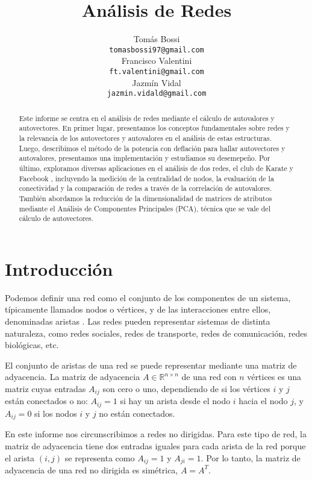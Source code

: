 \documentclass{article}
\title{Análisis de Redes}
\author{%
  Tomás Bossi\\
  \texttt{tomasbossi97@gmail.com} \\
  \And
  Francisco Valentini \\
  \texttt{ft.valentini@gmail.com} \\
  \And
  Jazmín Vidal \\
  \texttt{jazmin.vidald@gmail.com} \\
}
\begin{document}
\maketitle

\begin{abstract}
Este informe se centra en el análisis de redes mediante el cálculo de autovalores y autovectores. En primer lugar, presentamos los conceptos fundamentales sobre redes y la relevancia de los autovectores y autovalores en el análisis de estas estructuras. Luego, describimos el método de la potencia con deflación para hallar autovectores y autovalores, presentamos una implementación y estudiamos su desemepeño. Por último, exploramos diversas aplicaciones en el análisis de dos redes, el club de Karate \citep{zachary1977information} y Facebook \citep{leskovec2012learning}, incluyendo la medición de la centralidad de nodos, la evaluación de la conectividad y la comparación de redes a través de la correlación de autovalores. También abordamos la reducción de la dimensionalidad de matrices de atributos mediante el Análisis de Componentes Principales (PCA), técnica que se vale del cálculo de autovectores.
\end{abstract}

\section{Introducción} \label{sec:intro}

Podemos definir una red como el conjunto de los componentes de un sistema, típicamente llamados nodos o vértices, y de las interacciones entre ellos, denominadas aristas \citep{barabasi2013network}. Las redes pueden representar sistemas de distinta naturaleza, como redes sociales, redes de transporte, redes de comunicación, redes biológicas, etc. 

El conjunto de aristas de una red se puede representar mediante una matriz de adyacencia. La matriz de adyacencia $A \in \mathbb{R}^{n \times n}$ de una red con $n$ vértices es una matriz cuyas entradas $A_{ij}$ son cero o uno, dependiendo de si los vértices $i$ y $j$ están conectados o no: $A_{ij} = 1$ si hay un arista desde el nodo $i$ hacia el nodo $j$, y $A_{ij} = 0$ si los nodos $i$ y $j$ no están conectados. 

En este informe nos circunscribimos a redes no dirigidas. Para este tipo de red, la matriz de adyacencia tiene dos entradas iguales para cada arista de la red porque el arista $(i, j)$ se representa como $A_{ij} = 1$ y $A_{ji} = 1$. Por lo tanto, la matriz de adyacencia de una red no dirigida es simétrica, $A=A^T$.
\end{document}

